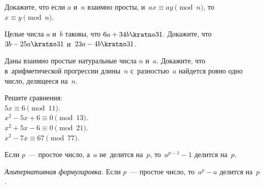 


\begin{problems}

\item{}
Докажите, что если $a$ и~$n$ взаимно просты,
и~$ax \equiv ay \pmod{n}$, то~$x \equiv y \pmod{n}$.

\item
Целые числа $a$ и~$b$ таковы, что $6 a + 34 b \kratno 31$.
Докажите, что $3 b - 25 a \kratno 31$ и~$23 a - 4 b \kratno 31$.

\item
Даны взаимно простые натуральные числа $n$ и~$a$.
Докажите, что в~арифметической прогрессии длины~$n$ с~разностью~$a$
найдется ровно одно число, делящееся на~$n$.

\item
Решите сравнения:
\\
\subproblem
$5 x \equiv 6 \pmod {11}$.
\\
\subproblem
$x^2 - 5 x + 6 \equiv 0 \pmod {13}$.
\\
\subproblem
$x^2 + 5 x - 6 \equiv 0 \pmod {21}$.
\\
\subproblem
$x^2 - 7 x \equiv 67 \pmod {77}$.

\end{problems}

Если $p$~--- простое число, а~$a$ не~делится на~$p$, то~$a^{p-1} - 1$ делится на~$p$.

\emph{Альтернативная формулировка.}
Если $p$~--- простое число, то~$a^{p} - a$ делится на~$p$.

